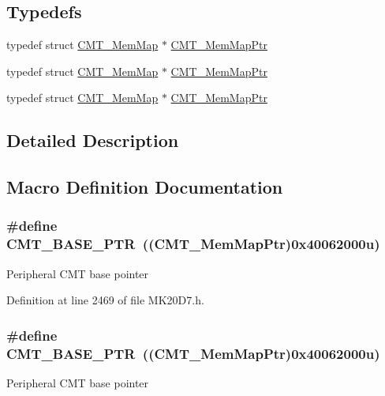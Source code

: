 \subsection*{Typedefs}
\begin{DoxyCompactItemize}
\item 
typedef struct \hyperlink{struct_c_m_t___mem_map}{C\+M\+T\+\_\+\+Mem\+Map} $\ast$ \hyperlink{group___c_m_t___peripheral_ga9764155d28e775ee5d3200941c07f812}{C\+M\+T\+\_\+\+Mem\+Map\+Ptr}
\item 
typedef struct \hyperlink{struct_c_m_t___mem_map}{C\+M\+T\+\_\+\+Mem\+Map} $\ast$ \hyperlink{group___c_m_t___peripheral_ga9764155d28e775ee5d3200941c07f812}{C\+M\+T\+\_\+\+Mem\+Map\+Ptr}
\item 
typedef struct \hyperlink{struct_c_m_t___mem_map}{C\+M\+T\+\_\+\+Mem\+Map} $\ast$ \hyperlink{group___c_m_t___peripheral_ga9764155d28e775ee5d3200941c07f812}{C\+M\+T\+\_\+\+Mem\+Map\+Ptr}
\end{DoxyCompactItemize}


\subsection{Detailed Description}


\subsection{Macro Definition Documentation}
\subsubsection[{\texorpdfstring{C\+M\+T\+\_\+\+B\+A\+S\+E\+\_\+\+P\+TR}{CMT_BASE_PTR}}]{\setlength{\rightskip}{0pt plus 5cm}\#define C\+M\+T\+\_\+\+B\+A\+S\+E\+\_\+\+P\+TR~(({\bf C\+M\+T\+\_\+\+Mem\+Map\+Ptr})0x40062000u)}\hypertarget{group___c_m_t___peripheral_gae361f199741d5276c4618edb9ee289b7}{}\label{group___c_m_t___peripheral_gae361f199741d5276c4618edb9ee289b7}
Peripheral C\+MT base pointer 

Definition at line 2469 of file M\+K20\+D7.\+h.

\subsubsection[{\texorpdfstring{C\+M\+T\+\_\+\+B\+A\+S\+E\+\_\+\+P\+TR}{CMT_BASE_PTR}}]{\setlength{\rightskip}{0pt plus 5cm}\#define C\+M\+T\+\_\+\+B\+A\+S\+E\+\_\+\+P\+TR~(({\bf C\+M\+T\+\_\+\+Mem\+Map\+Ptr})0x40062000u)}\hypertarget{group___c_m_t___peripheral_gae361f199741d5276c4618edb9ee289b7}{}\label{group___c_m_t___peripheral_gae361f199741d5276c4618edb9ee289b7}
Peripheral C\+MT base pointer 

